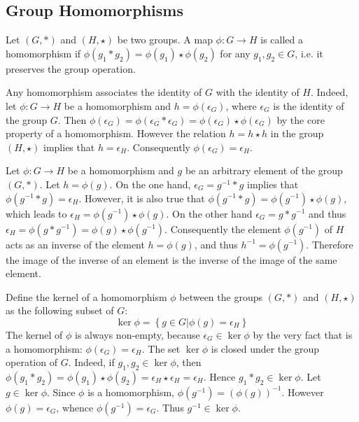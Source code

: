\documentclass[a4paper]{article}
\newcommand{\obj}[1]{\left\{{#1}\right\}}
\newcommand{\brac}[1]{{\left({#1}\right)}}
\begin{document}


\subsection{Group Homomorphisms} %
\label{sub:group_homomorphisms}
Let $\brac{G,\ast}$ and $\brac{H,\star}$ be two groups. A map $\phi:G\to H$ is called a homomorphism if $\phi(g_1\ast g_2)=\phi(g_1)\star \phi(g_2)$ for any $g_1,g_2\in G$, i.e. it preserves the group operation.

Any homomorphism associates the identity of $G$ with the identity of $H$. Indeed, let $\phi:G\to H$ be a homomorphism and $h=\phi(\epsilon_G)$, where $\epsilon_G$ is the identity of the group $G$. Then $\phi(\epsilon_G) = \phi(\epsilon_G\ast \epsilon_G) = \phi(\epsilon_G)\star \phi(\epsilon_G)$ by the core property of a homomorphism. However the relation $h=h\star h$ in the group $\brac{H,\star}$ implies that $h=\epsilon_H$. Consequently $\phi(\epsilon_G)=\epsilon_H$.

Let $\phi:G\to H$ be a homomorphism and $g$ be an arbitrary element of the group $\brac{G, \ast}$. Let $h=\phi(g)$. On the one hand, $\epsilon_G = g^{-1}\ast g$ implies that $\phi(g^{-1}\ast g) = \epsilon_H$. However, it is also true that $\phi(g^{-1}\ast g) = \phi(g^{-1})\star \phi(g)$, which leads to $\epsilon_H = \phi(g^{-1})\star \phi(g)$. On the other hand $\epsilon_G = g\ast g^{-1}$ and thus $\epsilon_H = \phi(g\ast g^{-1}) = \phi(g)\star \phi(g^{-1})$. Consequently the element $\phi(g^{-1})$ of $H$ acts as an inverse of the element $h=\phi(g)$, and thus $h^{-1} = \phi(g^{-1})$. Therefore the image of the inverse of an element is the inverse of the image of the same element.

Define the kernel of a homomorphism $\phi$ between the groups $\brac{G, \ast}$ and $\brac{H, \star}$ as the following subset of $G$:\[\ker{\phi} = \obj{g\in G\vert \phi(g)=\epsilon_H}\] The kernel of $\phi$ is always non-empty, because $\epsilon_G\in \ker{\phi}$ by the very fact that is a homomorphism: $\phi(\epsilon_G)=\epsilon_H$.
The set $\ker{\phi}$ is closed under the group operation of $G$. Indeed, if $g_1, g_2\in \ker{\phi}$, then $\phi(g_1\ast g_2) = \phi(g_1)\star \phi(g_2) = \epsilon_H\star \epsilon_H = \epsilon_H$. Hence $g_1\ast g_2\in \ker{\phi}$.
Let $g\in \ker{\phi}$. Since $\phi$ is a homomorphism, $\phi(g^{-1})=\brac{\phi(g)}^{-1}$. However $\phi(g)=\epsilon_G$, whence $\phi(g^{-1})=\epsilon_G$. Thus $g^{-1}\in \ker{\phi}$.
\end{document}
